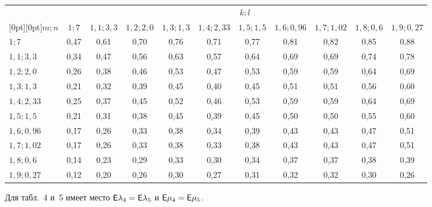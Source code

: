 \begin{multicols}{2}
\begin{table*}
\begin{center}
\tabcolsep=5.5pt
 \begin{tabular}{|l|c|c|c|c|c|c|c|c|c|c|}
 \hline
 &\multicolumn{10}{c|}{${k; l}$}\\
 \cline{2-11}
 \multicolumn{1}{|c|}{\raisebox{6pt}[0pt][0pt]{${m;n}$}}  &
${1; 7}$ & ${1{,}1; 3{,}3}$ & ${1{,}2; 2{,}0}$ & ${1{,}3; 1{,}3}$ &
 ${1{,}4; 2{,}33}$ & ${1{,}5; 1{,}5}$ & ${1{,}6; 0{,}96}$ & ${1{,}7; 1{,}02}$ &
 ${1{,}8; 0{,}6}$ & ${1{,}9; 0{,}27}$\\
 \hline
 \hphantom{9,}${1; 7}$&0,47&0,61&0,70&0,76&0,71&0,77&0,81&0,82&0,85&0,88\\
${1{,}1; 3{,}3}$&0,34&0,47&0,56&0,63&0,57&0,64&0,69&0,69&0,74&0,78\\
${1{,}2; 2{,}0}$&0,26&0,38&0,46&0,53&0,47&0,53&0,59&0,59&0,64&0,69\\
${1{,}3; 1{,}3}$&0,21&0,32&0,39&0,45&0,40&0,45&0,51&0,51&0,56&0,60\\
${1{,}4; 2{,}33}$&0,25&0,37&0,45&0,52&0,46&0,53&0,59&0,59&0,64&0,69\\
${1{,}5; 1{,}5}$&0,21&0,31&0,38&0,45&0,39&0,45&0,50&0,50&0,55&0,60\\
${1{,}6; 0{,}96}$&0,17&0,26&0,33&0,38&0,34&0,39&0,43&0,43&0,47&0,51\\
${1{,}7; 1{,}02}$&0,17&0,26&0,33&0,38&0,33&0,38&0,43&0,43&0,47&0,51\\
${1{,}8; 0{,}6}$&0,14&0,23&0,29&0,33&0,30&0,34&0,37&0,37&0,38&0,39\\
${1{,}9; 0{,}27}$&0,12&0,20&0,26&0,30&0,27&0,31&0,32&0,32&0,30&0,26\\
 \hline
 \end{tabular}
 \end{center}
 \vspace*{-16pt}
 \end{table*}

Для табл.~4 и~5 имеет место ${\sf E}\lambda_4\hm={\sf E}\lambda_5$ и
${\sf E}\mu_4\hm={\sf E}\mu_5$.

\begin{table*}\small %
\begin{center}
\vspace*{2ex}


\end{center}
\end{table*}
\end{multicols}
